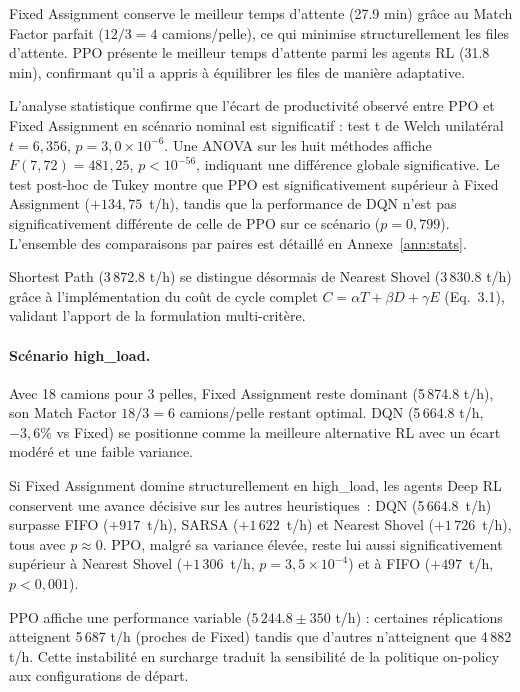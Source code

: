\documentclass[11pt,a4paper]{report}
\begin{document}
Fixed Assignment conserve le meilleur temps d'attente (27.9 min) grâce au Match Factor parfait ($12/3 = 4$ camions/pelle), ce qui minimise structurellement les files d'attente. PPO présente le meilleur temps d'attente parmi les agents RL (31.8 min), confirmant qu'il a appris à équilibrer les files de manière adaptative.

L'analyse statistique confirme que l'écart de productivité observé entre PPO et Fixed Assignment en scénario nominal est significatif : test t de Welch unilatéral $t = 6{,}356$, $p = 3{,}0 \times 10^{-6}$. Une ANOVA sur les huit méthodes affiche $F(7, 72) = 481{,}25$, $p < 10^{-56}$, indiquant une différence globale significative. Le test post-hoc de Tukey montre que PPO est significativement supérieur à Fixed Assignment ($+134{,}75$~t/h), tandis que la performance de DQN n'est pas significativement différente de celle de PPO sur ce scénario ($p = 0{,}799$). L'ensemble des comparaisons par paires est détaillé en Annexe~\ref{ann:stats}.

Shortest Path (3\,872.8 t/h) se distingue désormais de Nearest Shovel (3\,830.8 t/h) grâce à l'implémentation du coût de cycle complet $C = \alpha T + \beta D + \gamma E$ (Eq.~3.1), validant l'apport de la formulation multi-critère.

\paragraph{Scénario high\_load.}
Avec 18 camions pour 3 pelles, Fixed Assignment reste dominant (5\,874.8 t/h), son Match Factor $18/3 = 6$ camions/pelle restant optimal. DQN (5\,664.8 t/h, $-3{,}6\%$ vs Fixed) se positionne comme la meilleure alternative RL avec un écart modéré et une faible variance.

Si Fixed Assignment domine structurellement en high\_load, les agents
Deep RL conservent une avance décisive sur les autres heuristiques~:
DQN (5\,664.8~t/h) surpasse FIFO ($+917$~t/h), SARSA ($+1\,622$~t/h)
et Nearest Shovel ($+1\,726$~t/h), tous avec $p \approx 0$.
PPO, malgré sa variance élevée, reste lui aussi significativement
supérieur à Nearest Shovel ($+1\,306$~t/h, $p = 3{,}5 \times 10^{-4}$)
et à FIFO ($+497$~t/h, $p < 0{,}001$).

PPO affiche une performance variable ($5\,244.8 \pm 350$ t/h) : certaines réplications atteignent 5\,687 t/h (proches de Fixed) tandis que d'autres n'atteignent que 4\,882 t/h. Cette instabilité en surcharge traduit la sensibilité de la politique on-policy aux configurations de départ.
\end{document}
